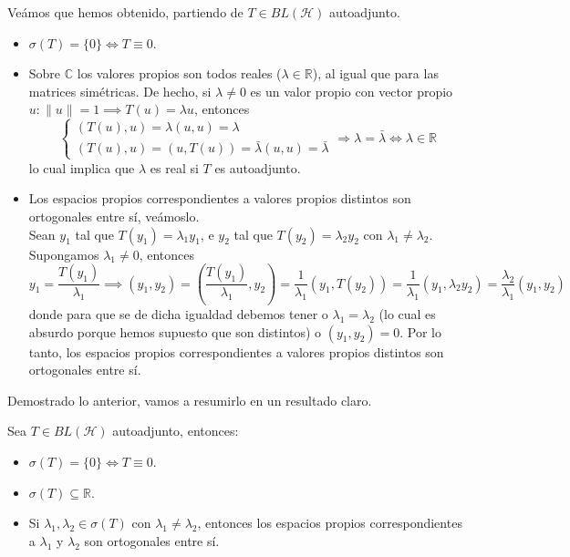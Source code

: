 \noindent
Veámos que hemos obtenido, partiendo de $T\in BL(\mathcal{H})$ autoadjunto.
\begin{itemize}
    \item $\sigma(T)=\{0\} \iff T \equiv 0$.
    \item Sobre $\mathbb{C}$ los valores propios son todos reales ($\lambda \in \mathbb{R}$), al igual que para las matrices simétricas. De hecho, si $\lambda \neq 0$ es un valor propio con vector propio $u : \|u\| = 1 \implies T(u) = \lambda u$, entonces
    \begin{equation*}        
        \begin{cases}
            ( T(u), u ) = \lambda ( u, u ) = \lambda  \\
            ( T(u), u )=( u, T(u) ) = \bar{\lambda} ( u, u ) = \bar{\lambda}
        \end{cases}
        \Longrightarrow \lambda = \bar{\lambda} \iff \lambda \in \mathbb{R}
    \end{equation*}
    lo cual implica que $\lambda$ es real si $T$ es autoadjunto.
    \item Los espacios propios correspondientes a valores propios distintos son ortogonales entre sí, veámoslo. \\ 
    \noindent
    Sean $y_1$ tal que $T(y_1) = \lambda_1 y_1$, e $y_2$ tal que $T(y_2) = \lambda_2 y_2$ con $\lambda_1 \neq \lambda_2$. Supongamos $\lambda_1 \neq 0$, entonces
    \begin{equation*}
        y_1=\dfrac{T(y_1)}{\lambda_1} \implies ( y_1, y_2 ) =\left( \frac{T(y_1)}{\lambda_1}, y_2 \right) = \frac{1}{\lambda_1} \left( y_1, T(y_2) \right) = \frac{1}{\lambda_1} \left( y_1, \lambda_2 y_2 \right) = \frac{\lambda_2}{\lambda_1} \left( y_1, y_2 \right)
    \end{equation*}
    donde para que se de dicha igualdad debemos tener o $\lambda_1 = \lambda_2$ (lo cual es absurdo porque hemos supuesto que son distintos) o $( y_1, y_2 ) = 0$. Por lo tanto, los espacios propios correspondientes a valores propios distintos son ortogonales entre sí. \\
\end{itemize}

\noindent
Demostrado lo anterior, vamos a resumirlo en un resultado claro.

\begin{prop}
    Sea $T \in BL(\mathcal{H})$ autoadjunto, entonces:
    \begin{itemize}
        \item $\sigma(T) =\{0\}\iff T\equiv 0$.
        \item $\sigma(T) \subseteq \mathbb{R}$.
        \item Si $\lambda_1, \lambda_2 \in \sigma(T)$ con $\lambda_1 \neq \lambda_2$, entonces los espacios propios correspondientes a $\lambda_1$ y $\lambda_2$ son ortogonales entre sí. \\
    \end{itemize}
\end{prop}

